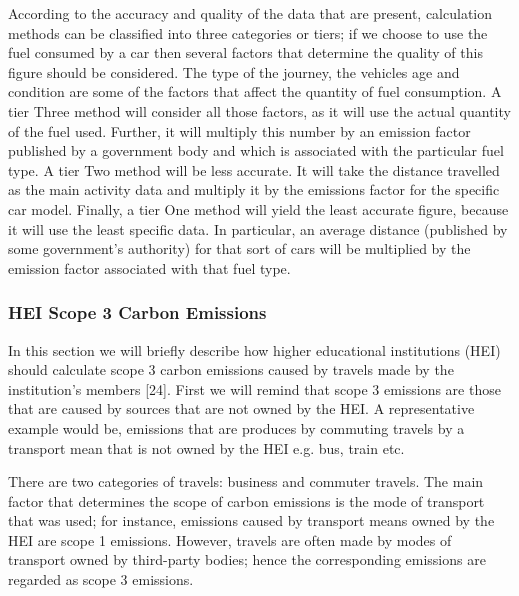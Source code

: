 According to the accuracy and quality of the data that are present, calculation methods can be classified into three categories or tiers; if we choose to use the fuel consumed by a car then several factors that determine the quality of this figure should be considered. The type of the journey, the vehicles age and condition are some of the factors that affect the quantity of fuel consumption. A tier Three method will consider all those factors, as it will use the actual quantity of the fuel used. Further, it will multiply this number by an emission factor published by a government body and which is associated with the particular fuel type. A tier Two method will be less accurate. It will take the distance travelled as the main activity data and multiply it by the emissions factor for the specific car model. Finally, a tier One method will yield the least accurate figure, because it will use the least specific data. In particular, an average distance (published by some government's authority) for that sort of cars will be multiplied by the emission factor associated with that fuel type.

\subsubsection{HEI Scope 3 Carbon Emissions}

In this section we will briefly describe how higher educational institutions (HEI) should calculate scope 3 carbon emissions caused by travels made by the institution's members [24]. First we will remind that scope 3 emissions are those that are caused by sources that are not owned by the HEI. A representative example would be, emissions that are produces by commuting travels by a transport mean that is not owned by the HEI e.g. bus, train etc.

There are two categories of travels: business and commuter travels. The main factor that determines the scope of carbon emissions is the mode of transport that was used; for instance, emissions caused by transport means owned by the HEI are scope 1 emissions. However, travels are often made by modes of transport owned by third-party bodies; hence the corresponding emissions are regarded as scope 3 emissions.


